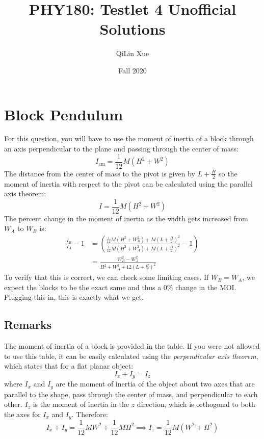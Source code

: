 \documentclass{article}
\title{PHY180: Testlet 4 Unofficial Solutions}
\author{QiLin Xue}
\date{Fall 2020}
\begin{document}
\maketitle
\section{Block Pendulum}
For this question, you will have to use the moment of inertia of a block through an axis perpendicular to the plane and passing through the center of mass:
\begin{equation}
    I_\text{cm} = \frac{1}{12}M(H^2+W^2)
    \label{eq:}
\end{equation}
The distance from the center of mass to the pivot is given by $L+\frac{H}{2}$ so the moment of inertia with respect to the pivot can be calculated using the parallel axis theorem:
\begin{equation}
    I=\frac{1}{12}M(H^2+W^2)
\end{equation}
The percent change in the moment of inertia as the width gets increased from $W_A$ to $W_B$ is:
\begin{align}
    \frac{I_B}{I_A}-1 &= \left(\frac{\frac{1}{12}M(H^2+W_B^2)+M\left(L+\frac{H}{2}\right)^2}{\frac{1}{12}M(H^2+W_A^2)+M\left(L+\frac{H}{2}\right)^2}-1\right) \\ 
    &= \boxed{\frac{W_B^2-W_A^2}{H^2+W_A^2+12\left(L+\frac{H}{2}\right)^2}}
\end{align}
To verify that this is correct, we can check some limiting cases. If $W_B=W_A$, we expect the blocks to be the exact same and thus a $0\%$ change in the MOI. Plugging this in, this is exactly what we get.
\subsection*{Remarks}
The moment of inertia of a block is provided in the table. If you were not allowed to use this table, it can be easily calculated using the \textit{perpendicular axis theorem}, which states that for a flat planar object:
\begin{equation}
    I_x+I_y=I_z
    \label{eq:}
\end{equation}
where $I_x$ and $I_y$ are the moment of inertia of the object about two axes that are parallel to the shape, pass through the center of mass, and perpendicular to each other. $I_z$ is the moment of inertia in the $z$ direction, which is orthogonal to both the axes for $I_x$ and $I_y$. Therefore:
\begin{equation}
    I_x+I_y = \frac{1}{12}MW^2 + \frac{1}{12}MH^2 \implies I_z = \frac{1}{12}M(W^2+H^2)
    \label{eq:}
\end{equation}
 
\end{document}
